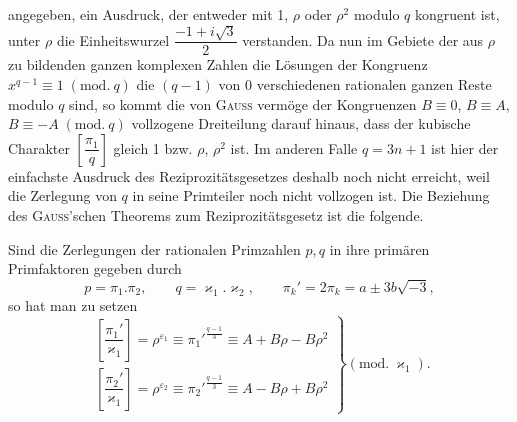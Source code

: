 \noindent\unskip{}angegeben, ein Ausdruck, der entweder mit 1, $\rho$ oder $\rho^2$ modulo $q$ kongruent ist, unter $\rho$ die Einheitswurzel
$\dfrac{-1+i\sqrt{3}}{2}$ verstanden. Da nun im Gebiete der aus $\rho$ zu bildenden ganzen komplexen Zahlen die Lösungen
der Kongruenz $x^{q-1}\equiv 1\;(\mathrm{mod.}\ q)$ die $(q-1)$ von 0 verschiedenen rationalen ganzen Reste modulo $q$ sind,
so kommt die von \textsc{Gauss} vermöge der Kongruenzen $B\equiv 0$, $B\equiv A$, $B\equiv -A\;(\mathrm{mod.}\ q)$ vollzogene Dreiteilung darauf hinaus, dass der kubische Charakter $\left[\dfrac{\pi_1}{q}\right]$ gleich 1 bzw. $\rho$, $\rho^2$ ist. Im anderen Falle $q=3n+1$
ist hier der einfachste Ausdruck des Reziprozitätsgesetzes deshalb noch nicht erreicht, weil die Zerlegung von
$q$ in seine Primteiler noch nicht vollzogen ist. Die Beziehung des \textsc{Gauss}'schen Theorems zum Reziprozitätsgesetz ist die folgende.

Sind die Zerlegungen der rationalen Primzahlen $p, q$ in ihre primären Primfaktoren gegeben durch
\[ p=\pi_1.\pi_2,\qquad q=\varkappa_1.\varkappa_2,\qquad \pi_k'=2\pi_k=a\pm 3b\sqrt{-3}, \]
so hat man zu setzen
\[
\left.\begin{array}{l}
\left[\dfrac{\pi_1'}{\varkappa_1}\right]=\rho^{\varepsilon_1}\equiv {\pi_1'}^{\frac{q-1}{3}}\equiv A+B\rho-B\rho^2 \\[2mm]
\left[\dfrac{\pi_2'}{\varkappa_1}\right]=\rho^{\varepsilon_2}\equiv {\pi_2'}^{\frac{q-1}{3}}\equiv A-B\rho+B\rho^2
\end{array}\right\}(\mathrm{mod.}\ \varkappa_1).
\]

